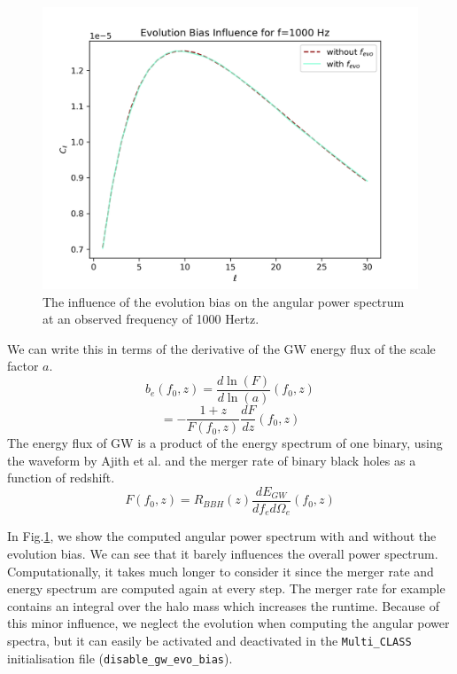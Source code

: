\begin{figure}
    \centering
    \includegraphics[width=0.8\linewidth]{Images/evo_bias_test.png}
    \caption{The influence of the evolution bias on the angular power spectrum at an observed frequency of 1000 Hertz.}
    \label{evo_bias_plot}
\end{figure} 

We can write this in terms of the derivative of the GW energy flux of the scale factor $a$.
\begin{equation}
    b_e(f_0, z) = \frac{d\ln(F)}{d\ln(a)}(f_0, z)
\end{equation}
\begin{equation}
    = -\frac{1+z}{F(f_0, z)}\frac{dF}{dz}(f_0, z)
\end{equation}
The energy flux of GW is a product of the energy spectrum of one binary, using the waveform by Ajith et al. \cite{ajith_inspiral-merger-ringdown_2011} and the merger rate of binary black holes as a function of redshift.
\begin{equation}
    F(f_0, z) = R_{BBH}(z) \frac{d E_{GW}}{df_e d\Omega_e}(f_0, z)
\end{equation}



In Fig.\ref{evo_bias_plot}, we show the computed angular power spectrum with and without the evolution bias. We can see that it barely influences the overall power spectrum. Computationally, it takes much longer to consider it since the merger rate and energy spectrum are computed again at every step. The merger rate for example contains an integral over the halo mass which increases the runtime.
Because of this minor influence, we neglect the evolution when computing the angular power spectra, but it can easily be activated and deactivated in the {\tt Multi\_CLASS} initialisation file ({\tt disable\_gw\_evo\_bias}).

